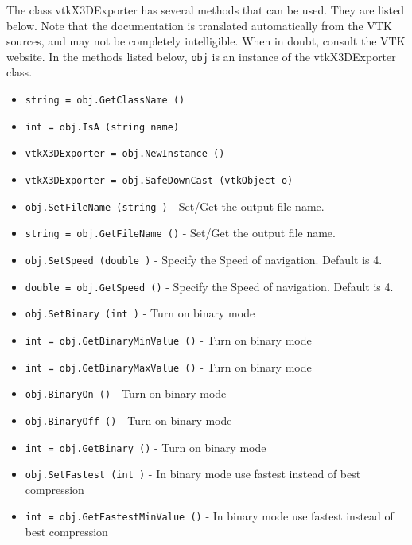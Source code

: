 The class vtkX3DExporter has several methods that can be used.
  They are listed below.
Note that the documentation is translated automatically from the VTK sources,
and may not be completely intelligible.  When in doubt, consult the VTK website.
In the methods listed below, \verb|obj| is an instance of the vtkX3DExporter class.
\begin{itemize}
\item  \verb|string = obj.GetClassName ()|

\item  \verb|int = obj.IsA (string name)|

\item  \verb|vtkX3DExporter = obj.NewInstance ()|

\item  \verb|vtkX3DExporter = obj.SafeDownCast (vtkObject o)|

\item  \verb|obj.SetFileName (string )| -  Set/Get the output file name.

\item  \verb|string = obj.GetFileName ()| -  Set/Get the output file name.

\item  \verb|obj.SetSpeed (double )| -  Specify the Speed of navigation. Default is 4.

\item  \verb|double = obj.GetSpeed ()| -  Specify the Speed of navigation. Default is 4.

\item  \verb|obj.SetBinary (int )| -  Turn on binary mode

\item  \verb|int = obj.GetBinaryMinValue ()| -  Turn on binary mode

\item  \verb|int = obj.GetBinaryMaxValue ()| -  Turn on binary mode

\item  \verb|obj.BinaryOn ()| -  Turn on binary mode

\item  \verb|obj.BinaryOff ()| -  Turn on binary mode

\item  \verb|int = obj.GetBinary ()| -  Turn on binary mode

\item  \verb|obj.SetFastest (int )| -  In binary mode use fastest instead of best compression

\item  \verb|int = obj.GetFastestMinValue ()| -  In binary mode use fastest instead of best compression


\end{itemize}
